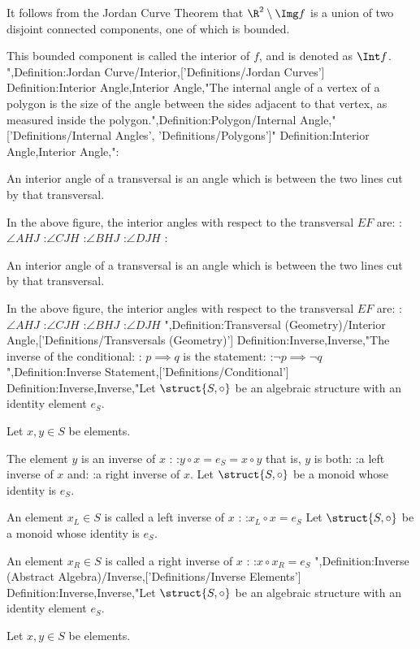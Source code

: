 It follows from the Jordan Curve Theorem that $\R^2 \setminus \Img f$ is a union of two disjoint connected components, one of which is bounded.

This bounded component is called the interior of $f$, and is denoted as $\Int f$.
",Definition:Jordan Curve/Interior,['Definitions/Jordan Curves']
Definition:Interior Angle,Interior Angle,"The internal angle of a vertex of a polygon is the size of the angle between the sides adjacent to that vertex, as measured inside the polygon.",Definition:Polygon/Internal Angle,"['Definitions/Internal Angles', 'Definitions/Polygons']"
Definition:Interior Angle,Interior Angle,":


An interior angle of a transversal is an angle which is between the two lines cut by that transversal.

In the above figure, the interior angles with respect to the transversal $EF$ are:
:$\angle AHJ$
:$\angle CJH$
:$\angle BHJ$
:$\angle DJH$
:


An interior angle of a transversal is an angle which is between the two lines cut by that transversal.

In the above figure, the interior angles with respect to the transversal $EF$ are:
:$\angle AHJ$
:$\angle CJH$
:$\angle BHJ$
:$\angle DJH$
",Definition:Transversal (Geometry)/Interior Angle,['Definitions/Transversals (Geometry)']
Definition:Inverse,Inverse,"The inverse of the conditional:
: $p \implies q$
is the statement:
:$\neg p \implies \neg q$",Definition:Inverse Statement,['Definitions/Conditional']
Definition:Inverse,Inverse,"Let $\struct {S, \circ}$ be an algebraic structure with an identity element $e_S$.

Let $x, y \in S$ be elements.


The element $y$ is an inverse of $x$ :
:$y \circ x = e_S = x \circ y$
that is,  $y$ is both:
:a left inverse of $x$
and:
:a right inverse of $x$.
Let $\struct {S, \circ}$ be a monoid whose identity is $e_S$.

An element $x_L \in S$ is called a left inverse of $x$ :
:$x_L \circ x = e_S$
Let $\struct {S, \circ}$ be a monoid whose identity is $e_S$.

An element $x_R \in S$ is called a right inverse of $x$ :
:$x \circ x_R = e_S$
",Definition:Inverse (Abstract Algebra)/Inverse,['Definitions/Inverse Elements']
Definition:Inverse,Inverse,"Let $\struct {S, \circ}$ be an algebraic structure with an identity element $e_S$.

Let $x, y \in S$ be elements.


